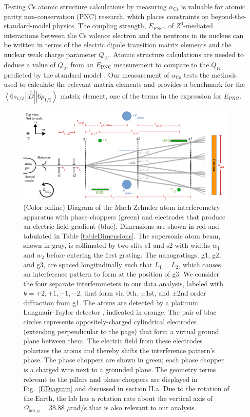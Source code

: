 \documentclass[twocolumn,prl,showpacs,superscriptaddress,longbibliography]{revtex4-1}   %
\newcommand{\brakett}[3]{\left.\left\langle #1 \right|\right|#2\left|\left| #3 \right\rangle\right.}
\newcommand{\figref}[1]{Fig.~\ref{#1}}
\newcommand{\acs}{\alpha_{\textrm{Cs}}}
\newcommand{\Omegalab}{\Omega_{\mathrm{lab},y}}
\begin{document}
Testing Cs atomic structure calculations by measuring $\acs$ is valuable for atomic parity non-conservation (PNC) research, which places constraints on beyond-the-standard-model physics. The coupling strength, $E_{\mathrm{PNC}}$, of $Z^0$-mediated interactions between the Cs valence electron and the neutrons in its nucleus can be written in terms of the electric dipole transition matrix elements and the nuclear weak charge parameter $Q_W$. Atomic structure calculations are needed to deduce a value of $Q_W$ from an $E_{\mathrm{PNC}}$ measurement \cite{Blundell1992,Cho1997,Derevianko2001,Porsev2009} to compare to the $Q_W$ predicted by the standard model \cite{Bouchiat1999,Dzuba2012}. Our measurement of $\acs$ tests the methods used to calculate the relevant matrix elements and provides a benchmark for the $\brakett{6s_{1/2}}{\hat{D}}{6p_{1/2}}$ matrix element, one of the terms in the expression for $E_{\mathrm{PNC}}$.

\begin{figure}
\includegraphics[width=\linewidth,keepaspectratio]{IFM_diagram2.pdf}
\caption{\label{IFMDiagram}(Color online) Diagram of the Mach-Zehnder atom interferometry apparatus with phase choppers (green) and electrodes that produce an electric field gradient (blue). Dimensions are shown in red and tabulated in Table \ref{tableDimensions}.  The supersonic atom beam, shown in gray, is collimated by two slits s1 and s2 with widths $w_1$ and $w_2$ before entering the first grating. 
The nanogratings, g1, g2, and g3, are spaced longitudinally such that $L_1 = L_2$, which causes an interference pattern to form at the position of g3.
We consider the four separate interferometers in our data analysis, labeled with $k=+2,+1,-1,-2$, that form via 0th, $\pm$1st, and $\pm$2nd order diffraction from g1.
The atoms are detected by a platinum Langmuir-Taylor detector \cite{Delhuille2002}, indicated in orange.
The pair of blue circles represents oppositely-charged cylindrical electrodes (extending perpendicular to the page) that form a virtual ground plane between them. The electric field from these electrodes polarizes the atoms and thereby shifts the interference pattern's phase. 
The phase choppers are shown in green; each phase chopper is a charged wire next to a grounded plane. The geometry terms relevant to the pillars and phase choppers are displayed in \figref{EDiagram} and discussed in section II.a.
Due to the rotation of the Earth, the lab has a rotation rate about the vertical axis of $\Omegalab = 38.88$ $\mu$rad/s that is also relevant to our analysis.  }
\end{figure}
\end{document}
